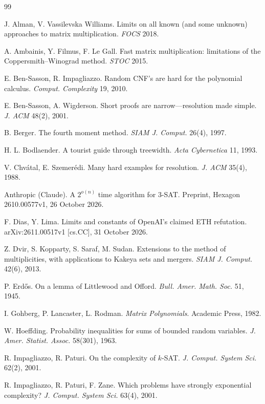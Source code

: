 \documentclass[11pt,a4paper]{article}
\theoremstyle{definition}
\theoremstyle{remark}
\begin{document}
\begin{thebibliography}{99}

 J. Alman, V. Vassilevska Williams. Limits on all known (and some unknown)
 approaches to matrix multiplication. \emph{FOCS} 2018.

 A. Ambainis, Y. Filmus, F. Le Gall. Fast matrix multiplication: limitations
 of the Coppersmith--Winograd method. \emph{STOC} 2015.

 E. Ben-Sasson, R. Impagliazzo. Random CNF's are hard for the polynomial
 calculus. \emph{Comput. Complexity} 19, 2010.

 E. Ben-Sasson, A. Wigderson. Short proofs are narrow---resolution made
 simple. \emph{J. ACM} 48(2), 2001.

 B. Berger. The fourth moment method. \emph{SIAM J. Comput.} 26(4), 1997.

 H. L. Bodlaender. A tourist guide through treewidth. \emph{Acta Cybernetica}
 11, 1993.

 V. Chv\'atal, E. Szemer\'edi. Many hard examples for resolution.
 \emph{J. ACM} 35(4), 1988.

 Anthropic (Claude). A $2^{o(n)}$ time algorithm for 3-SAT. Preprint,
 Hexagon 2610.00577v1, 26 October 2026.

 F. Dias, Y. Lima. Limits and constants of OpenAI's claimed ETH refutation.
 arXiv:2611.00517v1 [cs.CC], 31 October 2026.

 Z. Dvir, S. Kopparty, S. Saraf, M. Sudan. Extensions to the method of
 multiplicities, with applications to Kakeya sets and mergers. \emph{SIAM J. Comput.} 42(6),
 2013.

 P. Erd\H{o}s. On a lemma of Littlewood and Offord. \emph{Bull. Amer. Math.
 Soc.} 51, 1945.

 I. Gohberg, P. Lancaster, L. Rodman. \emph{Matrix Polynomials}. Academic
 Press, 1982.

 W. Hoeffding. Probability inequalities for sums of bounded random variables.
 \emph{J. Amer. Statist. Assoc.} 58(301), 1963.

 R. Impagliazzo, R. Paturi. On the complexity of $k$-SAT. \emph{J. Comput.
 System Sci.} 62(2), 2001.

 R. Impagliazzo, R. Paturi, F. Zane. Which problems have strongly exponential
 complexity? \emph{J. Comput. System Sci.} 63(4), 2001.


\end{thebibliography}
\end{document}
